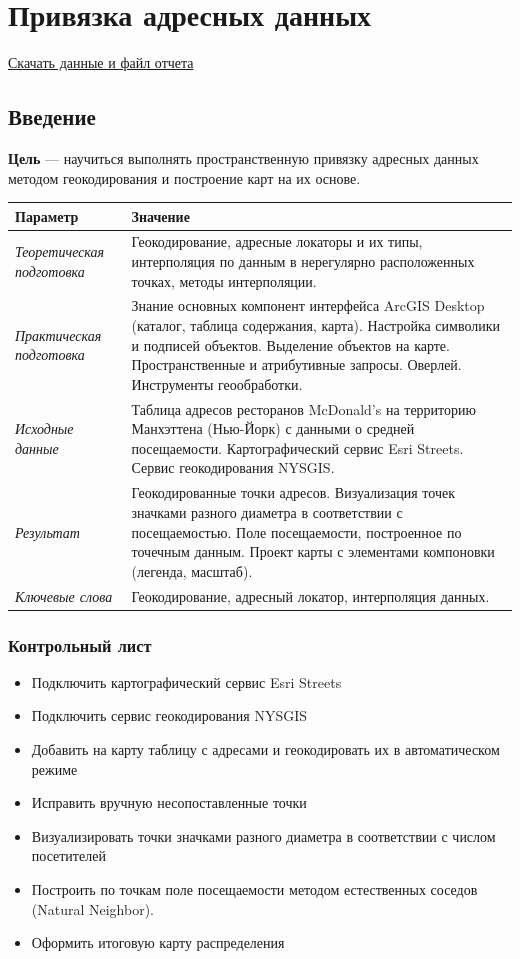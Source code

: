 \documentclass[12pt,]{book}
\providecommand{\tightlist}{%
  \setlength{\itemsep}{0pt}\setlength{\parskip}{0pt}}
\begin{document}
\hypertarget{geocoding}{%
\chapter{Привязка адресных данных}\label{geocoding}}

\href{http://autolab.geogr.msu.ru/gis/data/Ex09.zip}{Скачать данные и файл отчета}

\hypertarget{geocoding-intro}{%
\section{Введение}\label{geocoding-intro}}

\textbf{Цель} --- научиться выполнять пространственную привязку адресных данных методом геокодирования и построение карт на их основе.

\begin{longtable}[]{@{}ll@{}}
\toprule
Параметр & Значение\tabularnewline
\midrule
\endhead
\emph{Теоретическая подготовка} & Геокодирование, адресные локаторы и их типы, интерполяция по данным в нерегулярно расположенных точках, методы интерполяции.\tabularnewline
\emph{Практическая подготовка} & Знание основных компонент интерфейса ArcGIS Desktop (каталог, таблица содержания, карта). Настройка символики и подписей объектов. Выделение объектов на карте. Пространственные и атрибутивные запросы. Оверлей. Инструменты геообработки.\tabularnewline
\emph{Исходные данные} & Таблица адресов ресторанов McDonald's на территорию Манхэттена (Нью-Йорк) с данными о средней посещаемости. Картографический сервис Esri Streets. Сервис геокодирования NYSGIS.\tabularnewline
\emph{Результат} & Геокодированные точки адресов. Визуализация точек значками разного диаметра в соответствии с посещаемостью. Поле посещаемости, построенное по точечным данным. Проект карты с элементами компоновки (легенда, масштаб).\tabularnewline
\emph{Ключевые слова} & Геокодирование, адресный локатор, интерполяция данных.\tabularnewline
\bottomrule
\end{longtable}

\hypertarget{geocoding-control}{%
\subsection{Контрольный лист}\label{geocoding-control}}

\begin{itemize}
\tightlist
\item
  Подключить картографический сервис Esri Streets
\item
  Подключить сервис геокодирования NYSGIS
\item
  Добавить на карту таблицу с адресами и геокодировать их в автоматическом режиме
\item
  Исправить вручную несопоставленные точки
\item
  Визуализировать точки значками разного диаметра в соответствии с числом посетителей
\item
  Построить по точкам поле посещаемости методом естественных соседов (Natural Neighbor).
\item
  Оформить итоговую карту распределения
\end{itemize}
\end{document}
